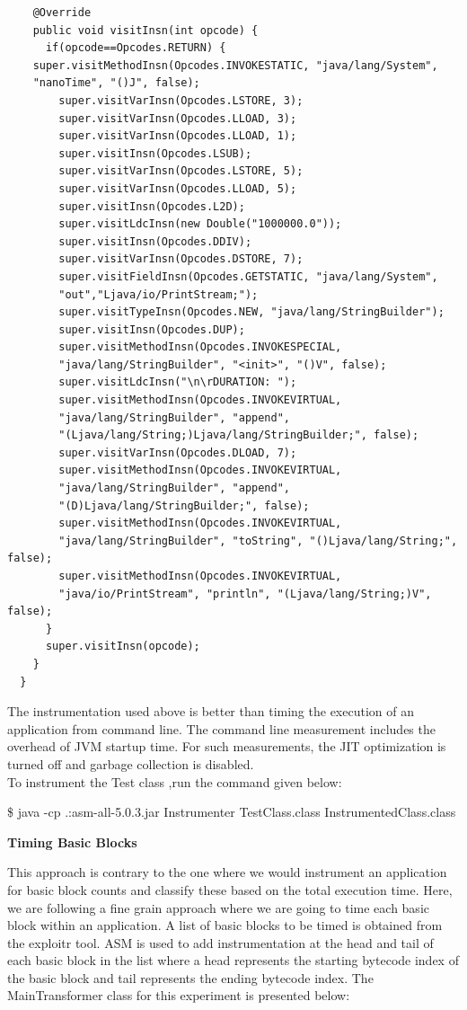 \documentclass[11pt]{article}
\begin{document}
\begin{lstlisting}
    @Override
    public void visitInsn(int opcode) {
      if(opcode==Opcodes.RETURN) {
	super.visitMethodInsn(Opcodes.INVOKESTATIC, "java/lang/System", 
	"nanoTime", "()J", false);
        super.visitVarInsn(Opcodes.LSTORE, 3);
        super.visitVarInsn(Opcodes.LLOAD, 3);
        super.visitVarInsn(Opcodes.LLOAD, 1);
        super.visitInsn(Opcodes.LSUB);
        super.visitVarInsn(Opcodes.LSTORE, 5);
        super.visitVarInsn(Opcodes.LLOAD, 5);
        super.visitInsn(Opcodes.L2D);
        super.visitLdcInsn(new Double("1000000.0"));
        super.visitInsn(Opcodes.DDIV);
        super.visitVarInsn(Opcodes.DSTORE, 7);
        super.visitFieldInsn(Opcodes.GETSTATIC, "java/lang/System", 
        "out","Ljava/io/PrintStream;");
        super.visitTypeInsn(Opcodes.NEW, "java/lang/StringBuilder");
        super.visitInsn(Opcodes.DUP);
        super.visitMethodInsn(Opcodes.INVOKESPECIAL, 
        "java/lang/StringBuilder", "<init>", "()V", false);
        super.visitLdcInsn("\n\rDURATION: ");
        super.visitMethodInsn(Opcodes.INVOKEVIRTUAL, 
        "java/lang/StringBuilder", "append", 	
        "(Ljava/lang/String;)Ljava/lang/StringBuilder;", false);
        super.visitVarInsn(Opcodes.DLOAD, 7);
        super.visitMethodInsn(Opcodes.INVOKEVIRTUAL, 
        "java/lang/StringBuilder", "append", 
        "(D)Ljava/lang/StringBuilder;", false);
        super.visitMethodInsn(Opcodes.INVOKEVIRTUAL,
        "java/lang/StringBuilder", "toString", "()Ljava/lang/String;", false);
        super.visitMethodInsn(Opcodes.INVOKEVIRTUAL, 
        "java/io/PrintStream", "println", "(Ljava/lang/String;)V", false);
      }
      super.visitInsn(opcode);
    }
  }
\end{lstlisting}

The instrumentation used above is better than timing the execution of an application from command line. The command line measurement includes the overhead of JVM startup time. For such measurements, the JIT optimization is turned off and garbage collection is disabled.\\

To instrument the Test class ,run the command given below:

\$ java -cp .:asm-all-5.0.3.jar Instrumenter TestClass.class InstrumentedClass.class

\textbf{Timing Basic Blocks}\newline

This approach is contrary to the one where we would instrument an application for basic block counts and classify these based on the total execution time. Here, we are following a fine grain approach where we are going to time each basic block within an application. A list of basic blocks to be timed is obtained from the exploitr tool. ASM is used to add instrumentation at the head and tail of each basic block in the list where a head represents the starting bytecode index of the basic block and tail represents the ending bytecode index. The MainTransformer class for this experiment is presented below:
\end{document}
